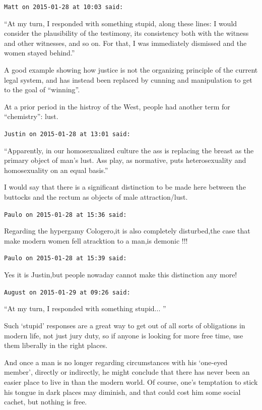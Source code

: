 \begin{footnotesize}
\begin{sffamily}
\texttt{Matt on 2015-01-28 at 10:03 said:}

``At my turn, I responded with something stupid, along these lines: I would consider the plausibility of the testimony, its consistency both with the witness and other witnesses, and so on. For that, I was immediately dismissed and the women stayed behind.''

A good example showing how justice is not the organizing principle of the current legal system, and has instead been replaced by cunning and manipulation to get to the goal of ``winning''.

At a prior period in the histroy of the West, people had another term for ``chemistry'': lust.

\hfill

\texttt{Justin on 2015-01-28 at 13:01 said:}

``Apparently, in our homosexualized culture the ass is replacing the breast as the primary object of man's lust. Ass play, as normative, puts heterosexuality and homosexuality on an equal basis.''

I would say that there is a significant distinction to be made here between the buttocks and the rectum as objects of male attraction/lust.

\hfill

\texttt{Paulo on 2015-01-28 at 15:36 said:}

Regarding the hypergamy Cologero,it is also completely disturbed,the case that make modern women fell atracktion to a man,is demonic !!!

\hfill

\texttt{Paulo on 2015-01-28 at 15:39 said:}

Yes it is Justin,but people nowaday cannot make this distinction any more!

\hfill

\texttt{August on 2015-01-29 at 09:26 said:}

``At my turn, I responded with something stupid... ''

Such `stupid' responses are a great way to get out of all sorts of obligations in modern life, not just jury duty, so if anyone is looking for more free time, use them liberally in the right places.

And once a man is no longer regarding circumstances with his `one-eyed member', directly or indirectly, he might conclude that there has never been an easier place to live in than the modern world. Of course, one's temptation to stick his tongue in dark places may diminish, and that could cost him some social cachet, but nothing is free.


\end{sffamily}
\end{footnotesize}
